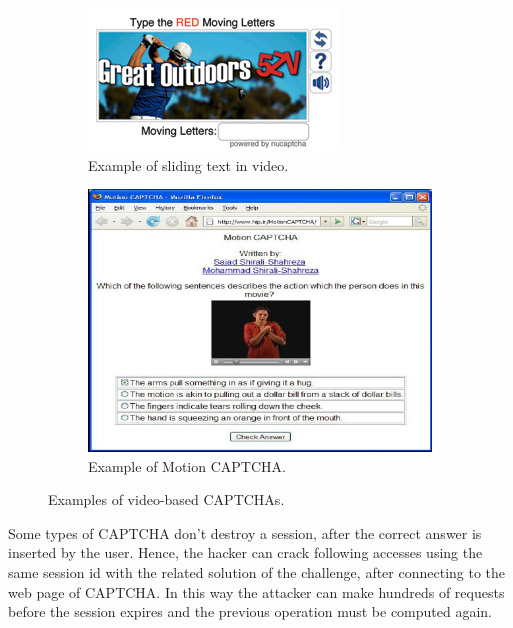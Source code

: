\begin{itemize}
{\begin{figure}[h]
\begin{subfigure}[b]{0.48\textwidth}
         \centering
         \includegraphics[width=\linewidth]{Images/StateOfArt/video_CAPTCHA}
         \caption{\footnotesize{Example of sliding text in video.}}
         \label{soa:video}
     \end{subfigure}
     \hfill
     \begin{subfigure}[b]{0.48\textwidth}
         \centering
         \includegraphics[width=\linewidth]{Images/StateOfArt/video_CAPTCHA2}
         \caption{\footnotesize{Example of Motion CAPTCHA\cite{Motion_CAPTCHA}.}}
        \label{soa:video2}
     \end{subfigure}
     \caption{\footnotesize{Examples of video-based CAPTCHAs.}}
\end{figure}
}
\end{itemize}
Some types of CAPTCHA don't destroy a session, after the correct answer is inserted by the user\cite{text_audio}. Hence, the hacker can crack following accesses using the same session id with the related solution of the challenge, after connecting to the web page of CAPTCHA. In this way the attacker can make hundreds of requests before the session expires and the previous operation must be computed again.\\
